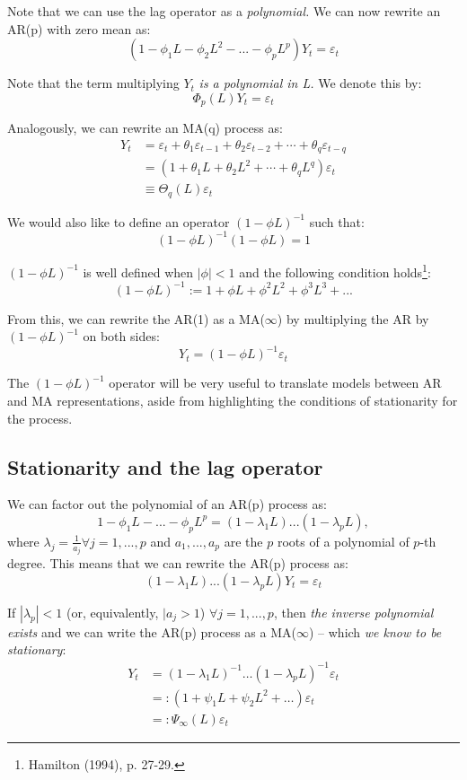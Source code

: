 \documentclass[11pt, a4paper]{report}
\theoremstyle{plain}
\theoremstyle{plain}
\theoremstyle{remark}
\begin{document}
Note that we can use the lag operator as a \textit{polynomial.} We can now rewrite an AR(p) with zero mean as:
$$ (1 - \phi_1 L - \phi_2 L^2 - ... - \phi_p L^p)Y_t = \varepsilon_{t} $$

Note that the term multiplying $Y_t$ \textit{is a polynomial in L.} We denote this by:
$$ \Phi_p (L) Y_t = \varepsilon_{t} $$

Analogously, we can rewrite an MA(q) process as:
$$\begin{aligned}
	Y_{t} &=\varepsilon_{t}+\theta_{1} \varepsilon_{t-1}+\theta_{2} \varepsilon_{t-2}+\cdots+\theta_{q} \varepsilon_{t-q} \\
	&=\left(1+\theta_{1} L+\theta_{2} L^{2}+\cdots+\theta_{q} L^{q}\right) \varepsilon_{t} \\
	& \equiv \Theta_{q}(L) \varepsilon_{t}
\end{aligned}$$

We would also like to define an operator $(1 - \phi L)^{-1}$ such that:
$$ (1 - \phi L)^{-1} (1 - \phi L) = 1 $$

$(1 - \phi L)^{-1}$ is well defined when $|\phi| < 1$ and the following condition holds\footnote{Hamilton (1994), p. 27-29.}:
$$ (1 - \phi L)^{-1} := 1 + \phi L + \phi^2 L^2 + \phi^3 L^3 + ... $$

From this, we can rewrite the AR(1) as a MA($\infty$) by multiplying the AR by $(1 - \phi L)^{-1}$ on both sides:
$$ Y_t = (1 - \phi L)^{-1} \varepsilon_{t}$$

The $(1 - \phi L)^{-1}$ operator will be very useful to translate models between AR and MA representations, aside from highlighting the conditions of stationarity for the process.


\subsection{Stationarity and the lag operator}

We can factor out the polynomial of an AR(p) process as:
$$ 1 - \phi_1 L - ... - \phi_{p} L^p = (1 - \lambda_1 L)...(1 - \lambda_p L), $$
where $\lambda_j = \frac{1}{a_j} \forall j = 1,..., p$ and $a_1, ..., a_p$ are the $p$ roots of a polynomial of $p$-th degree. This means that we can rewrite the AR(p) process as:
$$ (1 - \lambda_1 L)...(1 - \lambda_p L) Y_t = \varepsilon_{t} $$

If $|\lambda_p | < 1$ (or, equivalently, $|a_j > 1$) $\forall j = 1, ..., p$, then \textit{the inverse polynomial exists} and we can write the AR(p) process as a MA($\infty$) -- which \textit{we know to be stationary}:
$$\begin{aligned}
	Y_{t} &=\left(1-\lambda_{1} L\right)^{-1} \ldots\left(1-\lambda_{p} L\right)^{-1} \varepsilon_{t} \\
	&=:\left(1+\psi_{1} L+\psi_{2} L^{2}+\ldots\right) \varepsilon_{t} \\
	&=: \Psi_{\infty}(L) \varepsilon_{t}
\end{aligned}$$
\end{document}
